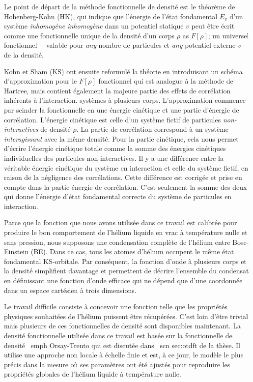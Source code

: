 		Le point de départ de la méthode fonctionnelle de densité est le théorème de Hohenberg-Kohn\citep{Hohenberg1964} (HK), qui indique que l'énergie de l'état fondamental $E_v$ d'un système \emph{inhomogène inhomogène} dans un potentiel statique $v$ peut être écrit comme une fonctionnelle unique de la densité d'un corps $\rho$ as $F[\rho]$; un universel fonctionnel ---valable pour \emph{any} nombre de particules et \emph{any} potentiel externe $v$--- de la densité.
		
		Kohn et Sham (KS) ont ensuite reformulé\citep{Kohn1965} la théorie en introduisant un schéma d'approximation pour le $F[\rho]$ fonctionnel qui est analogue à la méthode de Hartree, mais contient également la majeure partie des effets de corrélation inhérents à l'interaction. systèmes à plusieurs corps. L'approximation commence par scinder la fonctionnelle en une énergie cinétique et une partie d'énergie de corrélation. L'énergie cinétique est celle d'un système fictif de particules \emph{non-interactives} de densité $\rho$. La partie de corrélation correspond à un système \emph{interagissant} avec la même densité. Pour la partie cinétique, cela nous permet d'écrire l'énergie cinétique totale comme la somme des énergies cinétiques individuelles des particules non-interactives. Il y a une différence entre la véritable énergie cinétique du système en interaction et celle du système fictif, en raison de la négligence des corrélations. Cette différence est corrigée et prise en compte dans la partie énergie de corrélation. C'est seulement la somme des deux qui donne l'énergie d'état fondamental correcte du système de particules en interaction.
		
		Parce que la fonction que nous avons utilisée dans ce travail est calibrée pour produire le bon comportement de l'hélium liquide en vrac à température nulle et sans pression, nous supposons une condensation complète de l'hélium entre Bose-Einstein (BE). Dans ce cas, tous les atomes d'hélium occupent le même état fondamental KS-orbitale. Par conséquent, la fonction d'onde à plusieurs corps et la densité simplifient davantage et permettent de décrire l'ensemble du condensat en définissant une fonction d'onde efficace qui ne dépend que d'une coordonnée dans un espace cartésien à trois dimensions.
		
		Le travail difficile consiste à concevoir une fonction telle que les propriétés physiques souhaitées de l'hélium puissent être récupérées. C'est loin d'être trivial mais plusieurs de ces fonctionnelles de densité sont disponibles maintenant. La densité fonctionnelle utilisée dans ce travail est basée sur la fonctionnelle de densité \ emph {Orsay-Trento} qui est discutée dans \ scn {sec:otdft} de la thèse. Il utilise une approche non locale à échelle finie et est, à ce jour, le modèle le plus précis dans la mesure où ses paramètres ont été ajustés pour reproduire les propriétés globales de l'hélium liquide à température nulle.
		
